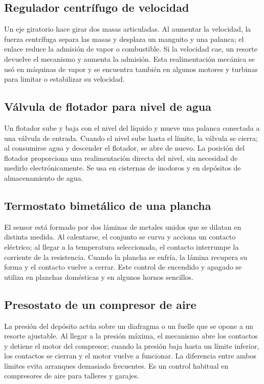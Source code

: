 \documentclass[12pt,a4paper]{article}
\begin{document}
\subsection{Regulador centrífugo de velocidad}

Un eje giratorio hace girar dos masas articuladas. Al aumentar la velocidad, la fuerza centrífuga separa las masas y desplaza un manguito y una palanca; el enlace reduce la admisión de vapor o combustible. Si la velocidad cae, un resorte devuelve el mecanismo y aumenta la admisión. Esta realimentación mecánica se usó en máquinas de vapor y se encuentra también en algunos motores y turbinas para limitar o estabilizar su velocidad.

\subsection{Válvula de flotador para nivel de agua}

Un flotador sube y baja con el nivel del líquido y mueve una palanca conectada a una válvula de entrada. Cuando el nivel sube hasta el límite, la válvula se cierra; al consumirse agua y descender el flotador, se abre de nuevo. La posición del flotador proporciona una realimentación directa del nivel, sin necesidad de medirlo electrónicamente. Se usa en cisternas de inodoros y en depósitos de almacenamiento de agua.

\subsection{Termostato bimetálico de una plancha}

El sensor está formado por dos láminas de metales unidos que se dilatan en distinta medida. Al calentarse, el conjunto se curva y acciona un contacto eléctrico; al llegar a la temperatura seleccionada, el contacto interrumpe la corriente de la resistencia. Cuando la plancha se enfría, la lámina recupera su forma y el contacto vuelve a cerrar. Este control de encendido y apagado se utiliza en planchas domésticas y en algunos hornos sencillos.

\subsection{Presostato de un compresor de aire}

La presión del depósito actúa sobre un diafragma o un fuelle que se opone a un resorte ajustable. Al llegar a la presión máxima, el mecanismo abre los contactos y detiene el motor del compresor; cuando la presión baja hasta un límite inferior, los contactos se cierran y el motor vuelve a funcionar. La diferencia entre ambos límites evita arranques demasiado frecuentes. Es un control habitual en compresores de aire para talleres y garajes.
\end{document}
